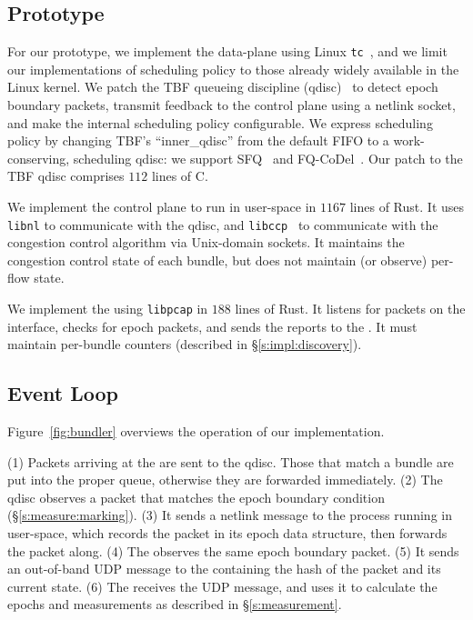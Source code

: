 \subsection{Prototype}\label{s:impl:prototype}
For our prototype, we implement the \inbox data-plane using Linux \texttt{tc}~\cite{tc}, and we limit our implementations of scheduling policy to those already widely available in the Linux kernel.
We patch the TBF queueing discipline (qdisc)~\cite{tbf} to detect epoch boundary packets, transmit feedback to the control plane using a netlink socket, and make the internal scheduling policy configurable.
We express scheduling policy by changing TBF's ``inner\_qdisc'' from the default FIFO to a work-conserving, scheduling qdisc: we support SFQ~\cite{sfq} and FQ-CoDel~\cite{fq-codel}.
Our patch to the TBF qdisc comprises $112$ lines of C.

We implement the \inbox control plane to run in user-space in $1167$ lines of Rust. 
It uses \texttt{libnl} to communicate with the qdisc, and \texttt{libccp}~\cite{ccp} to communicate with the congestion control algorithm via Unix-domain sockets.
It maintains the congestion control state of each bundle, but does not maintain (or observe) per-flow state.
 

We implement the \outbox using \texttt{libpcap} in $188$ lines of Rust. It listens for packets on the interface, checks for epoch packets, and sends the reports to the \inbox. It must maintain per-bundle counters (described in \S\ref{s:impl:discovery}).


\subsection{\name Event Loop}\label{s:impl:loop}
Figure~\ref{fig:bundler} overviews the operation of our \name implementation.

(1) Packets arriving at the \inbox are sent to the qdisc. Those that match a bundle are put into the proper queue, 
otherwise they are forwarded immediately. (2) The qdisc observes a packet that matches the epoch boundary
condition (\S\ref{s:measure:marking}). (3) It sends a netlink message to the \inbox process running in user-space, which records the packet
in its epoch data structure, then forwards the packet along. (4) The \outbox observes the same epoch boundary
packet. (5) It sends an out-of-band UDP message to the \inbox containing the hash of the packet and its current state. 
(6) The \inbox receives the UDP message, and uses it to calculate the epochs and measurements as described 
in \S\ref{s:measurement}.

